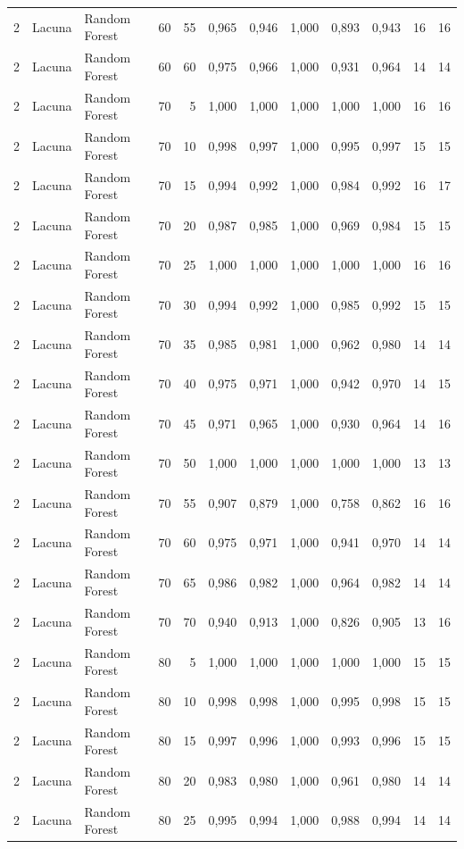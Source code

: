 \begin{longtable}{@{}rllrrrrrrrrr@{}}
2 & Lacuna & Random Forest & 60 & 55 & 0,965 & 0,946 & 1,000 & 0,893 & 0,943 & 16 & 16 \\
2 & Lacuna & Random Forest & 60 & 60 & 0,975 & 0,966 & 1,000 & 0,931 & 0,964 & 14 & 14 \\
2 & Lacuna & Random Forest & 70 & 5 & 1,000 & 1,000 & 1,000 & 1,000 & 1,000 & 16 & 16 \\
2 & Lacuna & Random Forest & 70 & 10 & 0,998 & 0,997 & 1,000 & 0,995 & 0,997 & 15 & 15 \\
2 & Lacuna & Random Forest & 70 & 15 & 0,994 & 0,992 & 1,000 & 0,984 & 0,992 & 16 & 17 \\
2 & Lacuna & Random Forest & 70 & 20 & 0,987 & 0,985 & 1,000 & 0,969 & 0,984 & 15 & 15 \\
2 & Lacuna & Random Forest & 70 & 25 & 1,000 & 1,000 & 1,000 & 1,000 & 1,000 & 16 & 16 \\
2 & Lacuna & Random Forest & 70 & 30 & 0,994 & 0,992 & 1,000 & 0,985 & 0,992 & 15 & 15 \\
2 & Lacuna & Random Forest & 70 & 35 & 0,985 & 0,981 & 1,000 & 0,962 & 0,980 & 14 & 14 \\
2 & Lacuna & Random Forest & 70 & 40 & 0,975 & 0,971 & 1,000 & 0,942 & 0,970 & 14 & 15 \\
2 & Lacuna & Random Forest & 70 & 45 & 0,971 & 0,965 & 1,000 & 0,930 & 0,964 & 14 & 16 \\
2 & Lacuna & Random Forest & 70 & 50 & 1,000 & 1,000 & 1,000 & 1,000 & 1,000 & 13 & 13 \\
2 & Lacuna & Random Forest & 70 & 55 & 0,907 & 0,879 & 1,000 & 0,758 & 0,862 & 16 & 16 \\
2 & Lacuna & Random Forest & 70 & 60 & 0,975 & 0,971 & 1,000 & 0,941 & 0,970 & 14 & 14 \\
2 & Lacuna & Random Forest & 70 & 65 & 0,986 & 0,982 & 1,000 & 0,964 & 0,982 & 14 & 14 \\
2 & Lacuna & Random Forest & 70 & 70 & 0,940 & 0,913 & 1,000 & 0,826 & 0,905 & 13 & 16 \\
2 & Lacuna & Random Forest & 80 & 5 & 1,000 & 1,000 & 1,000 & 1,000 & 1,000 & 15 & 15 \\
2 & Lacuna & Random Forest & 80 & 10 & 0,998 & 0,998 & 1,000 & 0,995 & 0,998 & 15 & 15 \\
2 & Lacuna & Random Forest & 80 & 15 & 0,997 & 0,996 & 1,000 & 0,993 & 0,996 & 15 & 15 \\
2 & Lacuna & Random Forest & 80 & 20 & 0,983 & 0,980 & 1,000 & 0,961 & 0,980 & 14 & 14 \\
2 & Lacuna & Random Forest & 80 & 25 & 0,995 & 0,994 & 1,000 & 0,988 & 0,994 & 14 & 14 \\

\end{longtable}
